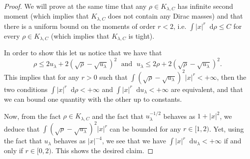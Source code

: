\documentclass[11pt,a4paper]{article}
\numberwithin{equation}{section}
\newcommand{\R}{{\mathbb{R}}}
\theoremstyle{plain}
\theoremstyle{remark}
\newcommand {\f}{\frac}
\newcommand{\diff}{\mathop{}\!\mathrm{d}}
\begin{document}
\begin{proof}
We will prove at the same time that any $\rho\in K_{\lambda , C}$ has infinite second moment (which implies that $K_{\lambda , C}$ does not contain any Dirac masses) and that there is a uniform bound on the moments of order $r<2$, i.e. $\int |x|^r\diff\rho\leq C$ for every $\rho\in K_{\lambda , C}$ (which implies that $K_{\lambda , C}$ is tight).

In order to show this let us notice that we have that 
$$
    \rho\leq 2u_\lambda+2(\sqrt{\rho}-\sqrt{u_\lambda})^2 \; \mbox{ and } \; u_\lambda\leq 2\rho+2(\sqrt{\rho}-\sqrt{u_\lambda})^2.
$$ 
This implies that for any $r>0$ such that $\int (\sqrt\rho-\sqrt{u_\lambda})^2|x|^r<+\infty$, then the two conditions $\int |x|^r\diff\rho<+\infty$ and $\int |x|^r\diff u_\lambda<+\infty$ are equivalent, and that we can bound one quantity with the other up to constants.

Now, from the fact $\rho\in K_{\lambda , C}$ and the fact that $u_\lambda^{-1/2}$ behaves as $1+|x|^2$, we deduce that $\int (\sqrt\rho-\sqrt{u_\lambda})^2|x|^r$ can be bounded for any $r\in [1,2)$. Yet, using the fact that
%
%
%
$u_\lambda$ behaves as $|x|^{-4}$, we see that we have $\int |x|^r\diff u_\lambda<+\infty$ if and only if $r\in [0,2)$. This shows the desired claim.
 


\end{proof}
\end{document}
